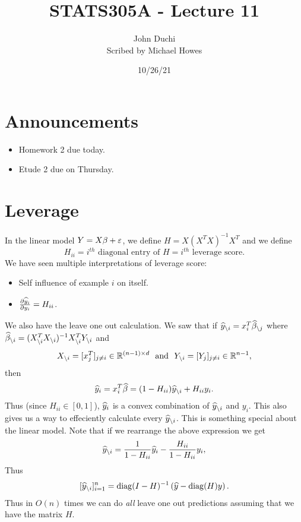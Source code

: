 




\title{STATS305A - Lecture 11}
\author{John Duchi\\ Scribed by Michael Howes}
\date{10/26/21}

\pagestyle{fancy}
\fancyhf{}


\maketitle
\tableofcontents
\section{Announcements}
\begin{itemize}
    \item Homework 2 due today.
    \item Etude 2 due on Thursday.
\end{itemize}
\section{Leverage}
In the linear model $Y = X\beta+\varepsilon$, we define $H=X(X^TX)^{-1}X^T$ and we define 
\[H_{ii} = i^{th} \text{ diagonal entry of }H = i^{th} \text{ leverage score}. \]
We have seen multiple interpretations of leverage score:
\begin{itemize}
    \item Self influence of example $i$ on itself.
    \item $\frac{\partial \widehat{y}_i}{\partial y_i} = H_{ii}$.
\end{itemize}
We also have the leave one out calculation. We saw that if $\widehat{y}_{\setminus i} = x_i^T\widehat{\beta}_{\setminus j}$ where $\widehat{\beta}_{\setminus i} = (X_{\setminus i}^TX_{\setminus i})^{-1}X^T_{\setminus i}Y_{\setminus i}$ and
\[X_{\setminus i}=[x_j^T]_{j\neq i} \in {\mathbb R}^{(n-1)\times d} ~~ \text{and}~~ Y_{\setminus i} = [Y_j]_{j\neq i} \in {\mathbb R}^{n-1}, \]
then 
\[\widehat{y}_i = x_i^T\widehat{\beta} = (1-H_{ii})\widehat{y}_{\setminus i}+H_{ii}y_i. \]
Thus (since $H_{ii}\in [0,1]$), $\widehat{y}_i$ is a convex combination of $\widehat{y}_{\setminus i}$ and $y_i$. This also gives us a way to effeciently calculate every $\widehat{y}_{\setminus i}$. This is something special about the linear model. Note that if we rearrange the above expression we get
\[\widehat{y}_{\setminus i} = \frac{1}{1-H_{ii}}\widehat{y}_i - \frac{H_{ii}}{1-H_{ii}}y_i, \]
Thus
\[[\widehat{y}_{\setminus i}]_{i=1}^n = \operatorname*{diag}(I-H)^{-1}\left(\widehat{y}-\operatorname*{diag}(H)y\right).  \]
Thus in $O(n)$ times we can do \emph{all} leave one out predictions assuming that we have the matrix $H$.

